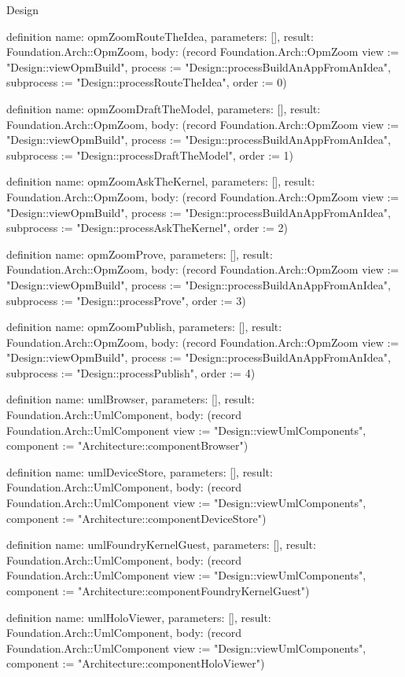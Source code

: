 \begin{lexlean}{Design}
\begin{semanticmodule}
definition{
  name: opmZoomRouteTheIdea,
  parameters: [],
  result: Foundation.Arch::OpmZoom,
  body: (record Foundation.Arch::OpmZoom {view := "Design::viewOpmBuild", process := "Design::processBuildAnAppFromAnIdea", subprocess := "Design::processRouteTheIdea", order := 0})
}

definition{
  name: opmZoomDraftTheModel,
  parameters: [],
  result: Foundation.Arch::OpmZoom,
  body: (record Foundation.Arch::OpmZoom {view := "Design::viewOpmBuild", process := "Design::processBuildAnAppFromAnIdea", subprocess := "Design::processDraftTheModel", order := 1})
}

definition{
  name: opmZoomAskTheKernel,
  parameters: [],
  result: Foundation.Arch::OpmZoom,
  body: (record Foundation.Arch::OpmZoom {view := "Design::viewOpmBuild", process := "Design::processBuildAnAppFromAnIdea", subprocess := "Design::processAskTheKernel", order := 2})
}

definition{
  name: opmZoomProve,
  parameters: [],
  result: Foundation.Arch::OpmZoom,
  body: (record Foundation.Arch::OpmZoom {view := "Design::viewOpmBuild", process := "Design::processBuildAnAppFromAnIdea", subprocess := "Design::processProve", order := 3})
}

definition{
  name: opmZoomPublish,
  parameters: [],
  result: Foundation.Arch::OpmZoom,
  body: (record Foundation.Arch::OpmZoom {view := "Design::viewOpmBuild", process := "Design::processBuildAnAppFromAnIdea", subprocess := "Design::processPublish", order := 4})
}

definition{
  name: umlBrowser,
  parameters: [],
  result: Foundation.Arch::UmlComponent,
  body: (record Foundation.Arch::UmlComponent {view := "Design::viewUmlComponents", component := "Architecture::componentBrowser"})
}

definition{
  name: umlDeviceStore,
  parameters: [],
  result: Foundation.Arch::UmlComponent,
  body: (record Foundation.Arch::UmlComponent {view := "Design::viewUmlComponents", component := "Architecture::componentDeviceStore"})
}

definition{
  name: umlFoundryKernelGuest,
  parameters: [],
  result: Foundation.Arch::UmlComponent,
  body: (record Foundation.Arch::UmlComponent {view := "Design::viewUmlComponents", component := "Architecture::componentFoundryKernelGuest"})
}

definition{
  name: umlHoloViewer,
  parameters: [],
  result: Foundation.Arch::UmlComponent,
  body: (record Foundation.Arch::UmlComponent {view := "Design::viewUmlComponents", component := "Architecture::componentHoloViewer"})
}


\end{semanticmodule}
\end{lexlean}
